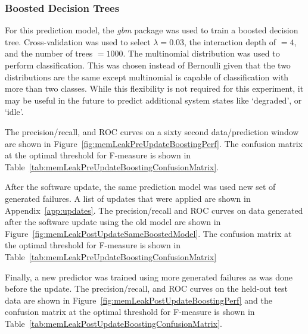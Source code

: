 \subsubsection{Boosted Decision Trees}
For this prediction model, the \emph{gbm} package was used to train a boosted
decision tree.  Cross-validation was used to select $\lambda = 0.03$, the
interaction depth of $= 4$, and the number of trees $= 1000$.  The multinomial
distribution was used to perform classification.  This was chosen instead of
Bernoulli given that the two distributions are the same except multinomial is
capable of classification with more than two classes.  While this flexibility
is not required for this experiment, it may be useful in the future to predict
additional system states like `degraded', or `idle'.

The precision/recall, and \ac{ROC} curves on a sixty second data/prediction
window are shown in Figure~\ref{fig:memLeakPreUpdateBoostingPerf}.  The
confusion matrix at the optimal threshold for F-measure is shown in
Table~\ref{tab:memLeakPreUpdateBoostingConfusionMatrix}.

\figMemLeakPreUpdateBoostingPerf
\tabMemLeakPreUpdateBoostingConfusionMatrix

After the software update, the same prediction model was used new set of
generated failures.  A list of updates that were applied are shown in
Appendix~\ref{app:updates}.  The precision/recall and \ac{ROC} curves on data
generated after the software update using the old model are shown in
Figure~\ref{fig:memLeakPostUpdateSameBoostedModel}.  The confusion matrix at
the optimal threshold for F-measure is shown in
Table~\ref{tab:memLeakPreUpdateBoostingConfusionMatrix}

\figMemLeakPostUpdateSameBoostedModel
\tabMemLeakPostUpdateBoostingSameModelConfusionMatrix

Finally, a new predictor was trained using more generated failures as was done
before the update.  The precision/recall, and \ac{ROC} curves on the held-out
test data are shown in Figure~\ref{fig:memLeakPostUpdateBoostingPerf} and the
confusion matrix at the optimal threshold for F-measure is shown in
Table~\ref{tab:memLeakPostUpdateBoostingConfusionMatrix}.

\figMemLeakPostUpdateBoostingPerf
\tabMemLeakPostUpdateBoostingConfusionMatrix

